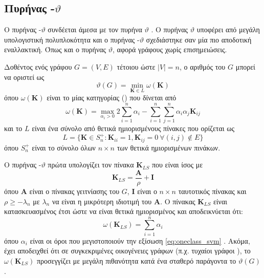 \subsection{Πυρήνας -$\vartheta$}
\label{ssec:svm_k}
Ο πυρήνας -$\vartheta$ συνδέεται άμεσα με τον πυρήνα  $\vartheta$ \cite{johansson2014global}.
Ο πυρήνας  $\vartheta$ υποφέρει από μεγάλη υπολογιστική πολυπλοκότητα και ο πυρήνας -$\vartheta$ σχεδιάστηκε σαν μία πιο αποδοτική εναλλακτική. 
Όπως και ο πυρήνας  $\vartheta$, αφορά γράφους χωρίς επισημειώσεις.

Δοθέντος ενός γράφου $G=(V,E)$ τέτοιου ώστε $|V| = n$, ο αριθμός  του $G$ μπορεί να οριστεί ως
\begin{equation}
    \vartheta(G) = \min_{\mathbf{K} \in L} \omega(\mathbf{K})
\end{equation}
όπου $\omega(\mathbf{K})$ είναι το  μίας κατηγορίας () που δίνεται από
\begin{equation}
    \label{eq:oneclass_svm}
    \omega(\mathbf{K}) = \max_{\alpha_i > 0} 2\sum_{i=1}^{n} \alpha_i - \sum_{i=1}^{n} \sum_{j=1}^{n} \alpha_i \alpha_j \mathbf{K}_{ij}
\end{equation}
και το $L$ είναι ένα σύνολο από θετικά ημιορισμένους πίνακες που ορίζεται ως
\begin{equation}
    L = \{ \mathbf{K} \in S_{n}^+ : \mathbf{K}_{ii} = 1, \mathbf{K}_{ij}=0 \: \forall (i,j) \not \in E \}
\end{equation}
όπου $S_{n}^+$ είναι το σύνολο όλων $n \times n$ των θετικά ημιορισμένων πινάκων.

Ο πυρήνας -$\vartheta$ πρώτα υπολογίζει τον πίνακα $\mathbf{K}_{LS}$ που είναι ίσος με
\begin{equation}
    \mathbf{K}_{LS} = \frac{\mathbf{A}}{\rho} + \mathbf{I}
\end{equation}
όπου $\mathbf{A}$ είναι ο πίνακας γειτνίασης του $G$, $\mathbf{I}$ είναι ο $n \times n$ ταυτοτικός πίνακας και $\rho \geq -\lambda_n$ με $\lambda_n$ να είναι η μικρότερη ιδιοτιμή του $\mathbf{A}$.
Ο πίνακας $\mathbf{K}_{LS}$ είναι κατασκευασμένος έτσι ώστε να είναι θετικά ημιορισμένος και αποδεικνύεται ότι: 
\begin{equation}
    \omega(\mathbf{K}_{LS}) = \sum_{i=1}^n \alpha_i
\end{equation}
όπου $\alpha_i$ είναι οι όροι που μεγιστοποιούν την εξίσωση \ref{eq:oneclass_svm} \cite{jethava2013lovasz}.
Ακόμα, έχει αποδειχθεί ότι σε συγκεκριμένες οικογένειες γράφων (π.χ. τυχαίοι γράφοι ), το  $\omega(\mathbf{K}_{LS})$ προσεγγίζει με μεγάλη πιθανότητα κατά ένα σταθερό παράγοντα το $\vartheta(G)$.

